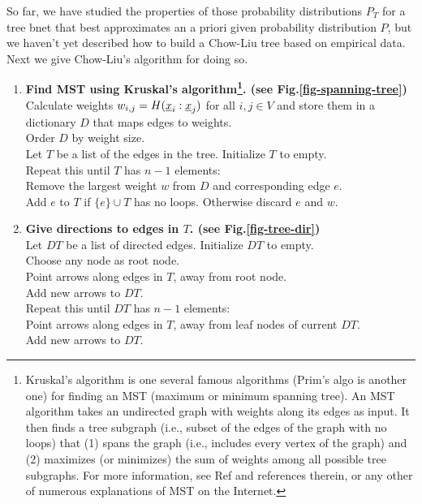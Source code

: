 So far,
we have
studied the properties
of those 
probability 
distributions
$P_T$
for a tree bnet
that 
best
approximates
an a priori given
probability
distribution $P$,
but
we haven't yet
described
how to 
build a Chow-Liu tree
based on
empirical data.
Next we give
Chow-Liu's algorithm
for doing so.


\begin{enumerate}
\item {\bf Find MST using Kruskal's 
algorithm\footnote{Kruskal's algorithm is 
one several famous algorithms (Prim's
algo is another one) for
finding an MST (maximum or
minimum spanning tree).  
An MST algorithm
 takes an
undirected graph 
with
weights along its edges as input.
It then
 finds a tree subgraph (i.e., subset
of the edges of the graph
with no loops) that
(1) spans the graph
(i.e., includes every vertex
of the graph) and (2)
maximizes (or
minimizes)
the
 sum of weights among all possible
 tree subgraphs.
For more information,
see Ref\cite{wiki-spanning-tree} and references
therein, or any other
of numerous explanations
of MST on the Internet.}.
(see Fig.\ref{fig-spanning-tree})}\\
Calculate weights $w_{i, j}=
H(\rvx_i:\rvx_j)$ for all
$i, j\in V$  and store them 
in a dictionary
 $D$
that maps edges to weights.\\
Order $D$ by weight size.\\
Let $T$ be a list of the edges in the tree. 
Initialize $T$ to  empty.\\
Repeat this until $T$ has $n-1$ elements:\\
\hspace*{1cm}Remove the largest weight $w$ from $D$
and corresponding edge $e$.\\
\hspace*{1cm}Add $e$ to $T$ if $\{e\}\cup T$
has no loops. Otherwise discard $e$ and $w$.

\item{\bf  Give directions to edges in $T$.
(see Fig.\ref{fig-tree-dir})}\\
Let $DT$ be a list of directed edges.
Initialize $DT$ to empty.\\
Choose any node as root node.\\
Point arrows along edges in $T$,
away 
from root node.\\
Add new arrows to $DT$.\\ 
Repeat this until $DT$ has $n-1$ elements:\\
\hspace*{1cm}Point arrows
along edges in $T$,
away from 
leaf nodes of current  $DT$.\\
\hspace*{1cm}Add new arrows to $DT$.
\end{enumerate}

